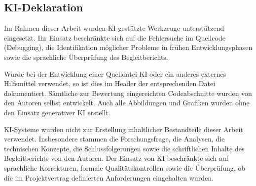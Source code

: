 \documentclass[../Main.tex]{subfiles}
\begin{document}
\listoffigures

\subsection{KI-Deklaration}

Im Rahmen dieser Arbeit wurden KI-gestützte Werkzeuge unterstützend eingesetzt. Ihr Einsatz beschränkte sich auf die Fehlersuche im Quellcode (Debugging), die Identifikation möglicher Probleme in frühen Entwicklungsphasen sowie die sprachliche Überprüfung des Begleitberichts.

Wurde bei der Entwicklung einer Quelldatei KI oder ein anderes externes Hilfsmittel verwendet, so ist dies im Header der entsprechenden Datei dokumentiert. Sämtliche zur Bewertung eingereichten Codeabschnitte wurden von den Autoren selbst entwickelt. Auch alle Abbildungen und Grafiken wurden ohne den Einsatz generativer KI erstellt.

KI-Systeme wurden nicht zur Erstellung inhaltlicher Bestandteile dieser Arbeit verwendet. Insbesondere stammen die Forschungsfrage, die Analysen, die technischen Konzepte, die Schlussfolgerungen sowie die schriftlichen Inhalte des Begleitberichts von den Autoren. Der Einsatz von KI beschränkte sich auf sprachliche Korrekturen, formale Qualitätskontrollen sowie die Überprüfung, ob die im Projektvertrag definierten Anforderungen eingehalten wurden.
\end{document}
